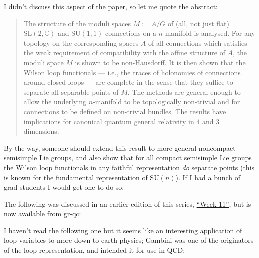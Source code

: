 \documentclass{article}
\def\tightlist{}
\renewcommand{\texttt}[1]{%
  \begingroup
  \ttfamily
  \begingroup\lccode`~=`/\lowercase{\endgroup\def~}{/\discretionary{}{}{}}%
  \begingroup\lccode`~=`[\lowercase{\endgroup\def~}{[\discretionary{}{}{}}%
  \begingroup\lccode`~=`.\lowercase{\endgroup\def~}{.\discretionary{}{}{}}%
  \catcode`/=\active\catcode`[=\active\catcode`.=\active
  \scantokens{#1\noexpand}%
  \endgroup
}
\begin{document}
I didn't discuss this aspect of the paper, so let me quote the abstract:

\begin{quote}
The structure of the moduli spaces \(M := A/G\) of (all, not just flat)
\(\mathrm{SL}(2,\mathbb{C})\) and \(\mathrm{SU}(1,1)\) connections on a
\(n\)-manifold is analysed. For any topology on the corresponding spaces
\(A\) of all connections which satisfies the weak requirement of
compatibility with the affine structure of \(A\), the moduli space \(M\)
is shown to be non-Hausdorff. It is then shown that the Wilson loop
functionals --- i.e., the traces of holonomies of connections around
closed loops --- are complete in the sense that they suffice to separate
all separable points of \(M\). The methods are general enough to allow
the underlying \(n\)-manifold to be topologically non-trivial and for
connections to be defined on non-trivial bundles. The results have
implications for canonical quantum general relativity in 4 and 3
dimensions.
\end{quote}

By the way, someone should extend this result to more general noncompact
semisimple Lie groups, and also show that for all compact semisimple Lie
groups the Wilson loop functionals in any faithful representation
\emph{do} separate points (this is known for the fundamental
representation of \(\mathrm{SU}(n)\)). If I had a bunch of grad students
I would get one to do so.

The following was discussed in an earlier edition of this series,
\protect\hyperlink{week11}{``Week 11''}, but is now available from
gr-qc:


I haven't read the following one but it seems like an interesting
application of loop variables to more down-to-earth physics; Gambini was
one of the originators of the loop representation, and intended it for
use in QCD:

\end{document}
